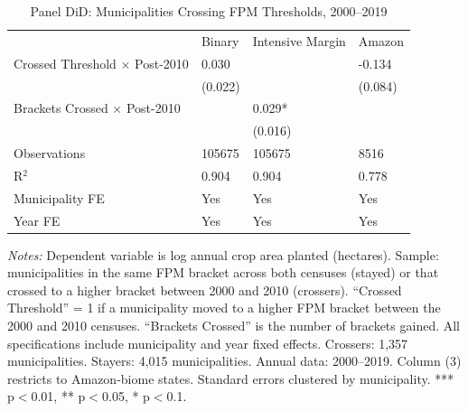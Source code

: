 \begin{table}[htbp]
\small
\centering
\caption{Panel DiD: Municipalities Crossing FPM Thresholds, 2000--2019}
\label{tab:tab3_panel_did}
\begin{tabular}{llll}
& Binary & Intensive Margin & Amazon \\
Crossed Threshold $\times$ Post-2010 & 0.030 &  & -0.134 \\
& (0.022) &  & (0.084) \\
Brackets Crossed $\times$ Post-2010 &  & 0.029* &  \\
&  & (0.016) &  \\
Observations & 105675 & 105675 & 8516 \\
R$^2$ & 0.904 & 0.904 & 0.778 \\
Municipality FE & Yes & Yes & Yes \\
Year FE & Yes & Yes & Yes \\
\end{tabular}
\begin{minipage}{0.95\textwidth}
\vspace{4pt}\scriptsize
\textit{Notes:} Dependent variable is log annual crop area planted (hectares). Sample: municipalities in the same FPM bracket across both censuses (stayed) or that crossed to a higher bracket between 2000 and 2010 (crossers). ``Crossed Threshold'' = 1 if a municipality moved to a higher FPM bracket between the 2000 and 2010 censuses. ``Brackets Crossed'' is the number of brackets gained. All specifications include municipality and year fixed effects. Crossers: 1,357 municipalities. Stayers: 4,015 municipalities. Annual data: 2000--2019. Column (3) restricts to Amazon-biome states. Standard errors clustered by municipality. *** p$<$0.01, ** p$<$0.05, * p$<$0.1.
\end{minipage}
\end{table}
